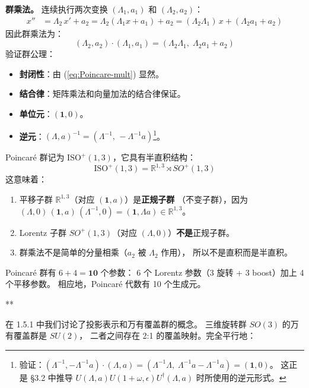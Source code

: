 \begin{tcolorbox}[colback=white!5,colframe=black!45]
  \textbf{群乘法。}
连续执行两次变换 $(\Lambda_1, a_1)$ 和 $(\Lambda_2, a_2)$：
\begin{align}
  x'' &= \Lambda_2\,x' + a_2 = \Lambda_2(\Lambda_1 x + a_1) + a_2
       = (\Lambda_2\Lambda_1)\,x + (\Lambda_2 a_1 + a_2)
\end{align}
因此群乘法为：
\begin{equation}\label{eq:Poincare-mult}
\boxed{
  (\Lambda_2, a_2)\cdot(\Lambda_1, a_1)
  = (\Lambda_2\Lambda_1,\;\Lambda_2 a_1 + a_2)
}
\end{equation}
验证群公理：
\begin{itemize}
  \item \textbf{封闭性}：由 (\ref{eq:Poincare-mult}) 显然。
  \item \textbf{结合律}：矩阵乘法和向量加法的结合律保证。
  \item \textbf{单位元}：$(\mathbf{1}, 0)$。
  \item \textbf{逆元}：$(\Lambda, a)^{-1} = (\Lambda^{-1},\,-\Lambda^{-1}a)$\footnote{
        验证：$(\Lambda^{-1}, -\Lambda^{-1}a)\cdot(\Lambda, a)
        = (\Lambda^{-1}\Lambda,\;\Lambda^{-1}a - \Lambda^{-1}a) = (\mathbf{1}, 0)$。
        这正是 \S3.2 中推导 $U(\Lambda,a)U(1+\omega,\epsilon)U^\dagger(\Lambda,a)$
        时所使用的逆元形式。}。
\end{itemize}
\end{tcolorbox}
\vspace{2ex}
\par
Poincar\'e 群记为 $\mathrm{ISO}^+(1,3)$，它具有半直积结构：
\begin{equation}\label{eq:semidirect}
\boxed{
  \mathrm{ISO}^+(1,3) = \mathbb{R}^{1,3} \rtimes SO^+(1,3)
}
\end{equation}
这意味着：
\begin{enumerate}
  \item 平移子群 $\mathbb{R}^{1,3}$（对应 $(\mathbf{1}, a)$）是\textbf{正规子群}
        （不变子群），因为
        $(\Lambda, 0)\,(\mathbf{1}, a)\,(\Lambda^{-1}, 0) = (\mathbf{1}, \Lambda a) \in \mathbb{R}^{1,3}$。
  \item Lorentz 子群 $SO^+(1,3)$（对应 $(\Lambda, 0)$）\textbf{不是}正规子群。
  \item 群乘法不是简单的分量相乘（$a_2$ 被 $\Lambda_2$ 作用），
        所以不是直积而是半直积。
\end{enumerate}
Poincar\'e 群有 $6 + 4 = \mathbf{10}$ 个参数：
6 个 Lorentz 参数（3 旋转 + 3 boost）加上 4 个平移参数。
相应地，Poincar\'e 代数有 10 个生成元。
\begin{center}
  \large ***
\end{center}
在 1.5.1 中我们讨论了投影表示和万有覆盖群的概念。
三维旋转群 $SO(3)$ 的万有覆盖群是 $SU(2)$，
二者之间存在 2:1 的覆盖映射。完全平行地：

